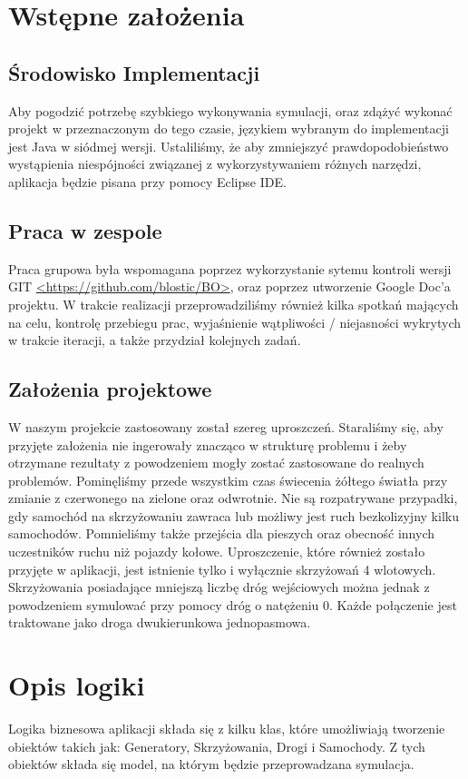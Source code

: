 \documentclass{article}
\begin{document}
\section{Wstępne założenia}

\subsection{Środowisko Implementacji}
    Aby pogodzić potrzebę szybkiego wykonywania symulacji, oraz zdążyć wykonać projekt w przeznaczonym do tego czasie, językiem wybranym do implementacji jest Java w siódmej wersji. Ustaliliśmy, że aby zmniejszyć prawdopodobieństwo wystąpienia niespójności związanej z wykorzystywaniem różnych narzędzi, aplikacja będzie pisana przy pomocy Eclipse IDE. 

\subsection{Praca w zespole}
    Praca grupowa była wspomagana poprzez wykorzystanie sytemu kontroli wersji GIT \url{<https://github.com/blostic/BO>}, oraz poprzez utworzenie Google Doc'a projektu. W trakcie realizacji przeprowadziliśmy również kilka spotkań mających na celu, kontrolę przebiegu prac, wyjaśnienie wątpliwości / niejasności wykrytych w trakcie iteracji, a także przydział kolejnych zadań.


\subsection{Założenia projektowe}
    W naszym projekcie zastosowany został szereg uproszczeń. Staraliśmy się, aby przyjęte założenia nie ingerowały znacząco w strukturę problemu i żeby otrzymane rezultaty z powodzeniem mogły zostać zastosowane do realnych problemów. Pominęliśmy przede wszystkim czas świecenia żółtego światła przy zmianie z czerwonego na zielone oraz odwrotnie. Nie są rozpatrywane przypadki, gdy samochód na skrzyżowaniu zawraca lub możliwy jest ruch bezkolizyjny kilku samochodów. Pomnieliśmy także przejścia dla pieszych oraz obecność innych uczestników ruchu niż pojazdy kołowe. Uproszczenie, które również zostało przyjęte w aplikacji, jest istnienie tylko i wyłącznie skrzyżowań 4 wlotowych. Skrzyżowania posiadające mniejszą liczbę dróg wejściowych można jednak z powodzeniem symulować przy pomocy dróg o natężeniu 0. Każde połączenie jest traktowane jako droga dwukierunkowa jednopasmowa.

\section{Opis logiki}
  Logika biznesowa aplikacji składa się z kilku klas, które umożliwiają tworzenie obiektów takich jak: Generatory, Skrzyżowania, Drogi i Samochody. Z tych obiektów składa się model, na którym będzie przeprowadzana symulacja. 
\end{document}
